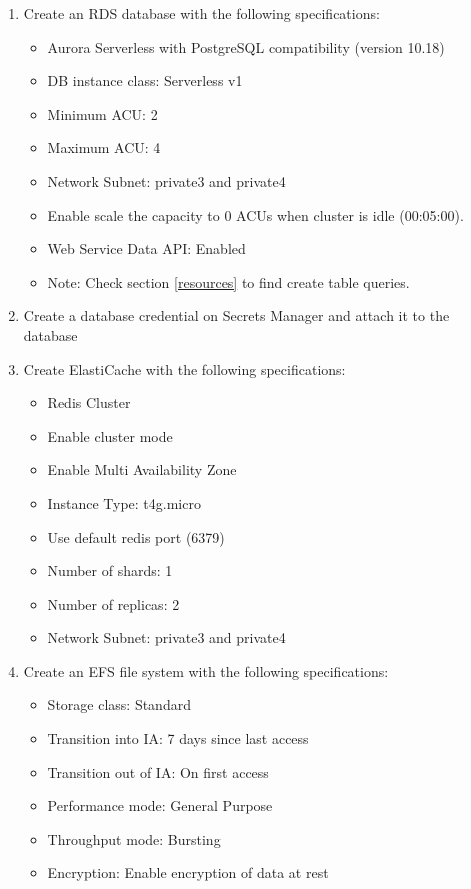 \documentclass{article}
\begin{document}
\begin{enumerate}
    \item Create an RDS database with the following specifications:
    \begin{itemize}
        \item Aurora Serverless with PostgreSQL compatibility (version 10.18)
        \item DB instance class: Serverless v1
        \item Minimum ACU: 2
        \item Maximum ACU: 4
        \item Network Subnet: private3 and private4
        \item Enable scale the capacity to 0 ACUs when cluster is idle (00:05:00).
        \item Web Service Data API: Enabled
        \item Note: Check section \ref{resources} to find create table queries.
    \end{itemize}
    \item Create a database credential on Secrets Manager and attach it to the database
    \item Create ElastiCache with the following specifications:
    \begin{itemize}
        \item Redis Cluster
        \item Enable cluster mode
        \item Enable Multi Availability Zone
        \item Instance Type: t4g.micro
        \item Use default redis port (6379)
        \item Number of shards: 1
        \item Number of replicas: 2
        \item Network Subnet: private3 and private4
    \end{itemize}
    \item Create an EFS file system with the following specifications:
    \begin{itemize}
        \item Storage class: Standard
        \item Transition into IA: 7 days since last access
        \item Transition out of IA: On first access
        \item Performance mode: General Purpose
        \item Throughput mode: Bursting
        \item Encryption: Enable encryption of data at rest

\end{itemize}
\end{enumerate}
\end{document}
